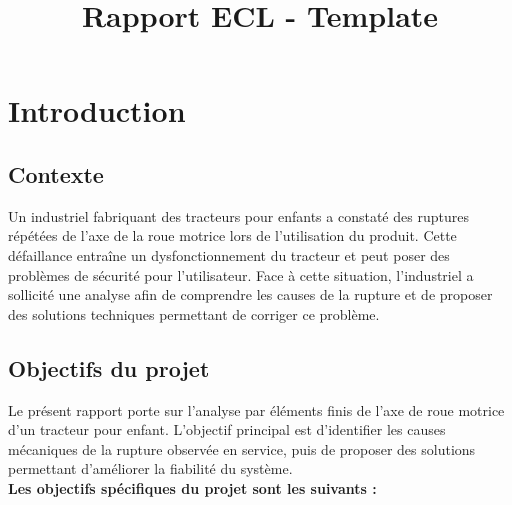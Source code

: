 \documentclass{rapportECL}
\title{Rapport ECL - Template} %
\begin{document}




        
\fairemarges %
\fairepagedegarde %
\tabledematieres %


 \section{Introduction}

\subsection{Contexte}

Un industriel fabriquant des tracteurs pour enfants a constaté des ruptures répétées de l’axe de la roue motrice lors de l’utilisation du produit. Cette défaillance entraîne un dysfonctionnement du tracteur et peut poser des problèmes de sécurité pour l’utilisateur. Face à cette situation, l’industriel a sollicité une analyse afin de comprendre les causes de la rupture et de proposer des solutions techniques permettant de corriger ce problème.

\subsection{Objectifs du projet}

Le présent rapport porte sur l’analyse par éléments finis de l’axe de roue motrice d’un tracteur pour enfant. L’objectif principal est d’identifier les causes mécaniques de la rupture observée en service, puis de proposer des solutions permettant d’améliorer la fiabilité du système.
\\
\textbf{Les objectifs spécifiques du projet sont les suivants :}
\end{document}
